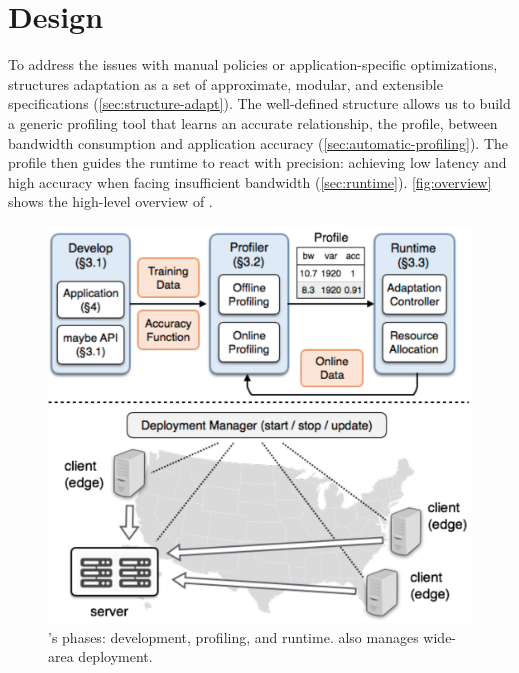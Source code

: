 \section{\sysname{} Design}
\label{sec:system}

To address the issues with manual policies or application-specific
optimizations, \sysname{} structures adaptation as a set of approximate,
modular, and extensible specifications (\autoref{sec:structure-adapt}). The
well-defined structure allows us to build a generic profiling tool that learns
an accurate relationship, the profile, between bandwidth consumption and
application accuracy (\autoref{sec:automatic-profiling}). The profile then
guides the runtime to react with precision: achieving low latency and high
accuracy when facing insufficient bandwidth
(\autoref{sec:runtime}). \autoref{fig:overview} shows the high-level overview of
\sysname{}.

\begin{figure}
  \centering
  \includegraphics[width=0.9\linewidth]{figures/system.pdf}
  \caption{\sysname{}'s phases: development, profiling, and runtime. \sysname{}
    also manages wide-area deployment.}
  \label{fig:overview}
\end{figure}





